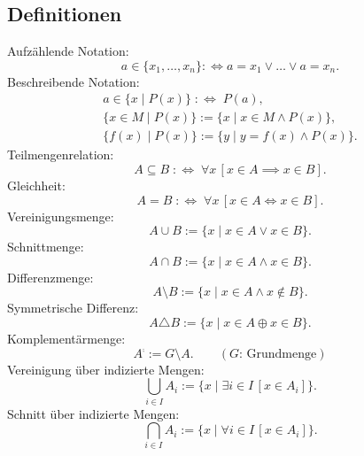 \subsection{Definitionen}
Aufzählende Notation:
\begin{equation}
a\in\{x_1,\ldots,x_n\} :\Leftrightarrow a=x_1\lor\ldots\lor a=x_n.
\end{equation}
Beschreibende Notation:
\begin{gather}
a\in\{x\mid P(x)\}\;:\Longleftrightarrow\; P(a),\\
\{x\in M\mid P(x)\} := \{x\mid x\in M\land P(x)\},\\
\{f(x)\mid P(x)\} := \{y\mid y=f(x)\land P(x)\}.
\end{gather}
Teilmengenrelation:
\begin{equation}
A\subseteq B\;:\Longleftrightarrow\; \forall x\,[x\in A\implies x\in B].
\end{equation}
Gleichheit:
\begin{equation}
A=B\;:\Longleftrightarrow\; \forall x\,[x\in A\iff x\in B].
\end{equation}
Vereinigungsmenge:
\begin{equation}
A\cup B:=\{x\mid x\in A\lor x\in B\}.
\end{equation}
Schnittmenge:
\begin{equation}
A\cap B:=\{x\mid x\in A\land x\in B\}.
\end{equation}
Differenzmenge:
\begin{equation}
A\setminus B:=\{x\mid x\in A\land x\not\in B\}.
\end{equation}
Symmetrische Differenz:
\begin{equation}
A\triangle B:=\{x\mid x\in A\oplus x\in B\}.
\end{equation}
Komplementärmenge:
\begin{equation}
A^\comp := G\setminus A.\qquad (\text{$G$: Grundmenge})
\end{equation}
Vereinigung über indizierte Mengen:
\begin{equation}
\bigcup_{i\in I} A_i := \{x\mid\exists i{\in}I\,[x\in A_i]\}.
\end{equation}
Schnitt über indizierte Mengen:
\begin{equation}
\bigcap_{i\in I} A_i := \{x\mid\forall i{\in}I\,[x\in A_i]\}.
\end{equation}


